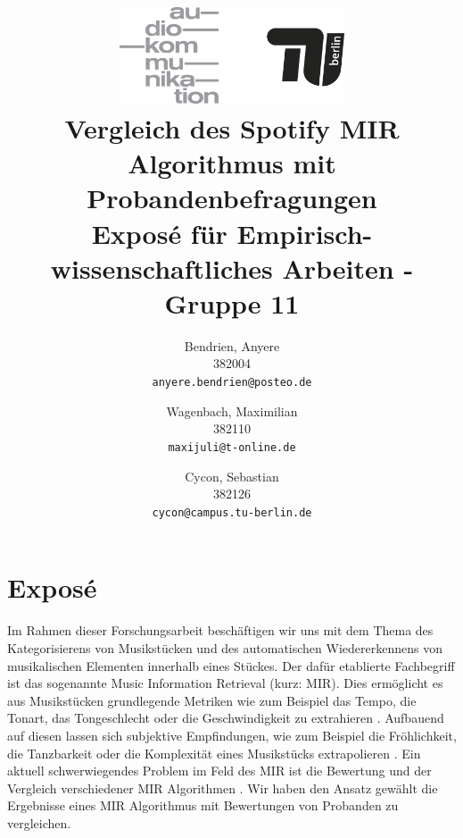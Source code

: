 





\title{
    \includegraphics[width=0.5\textwidth]{fig/audiokommtu-01.png}\\
    Vergleich des Spotify MIR Algorithmus mit Probandenbefragungen\\
    \vspace{2mm}
    \small{Exposé für Empirisch-wissenschaftliches Arbeiten - Gruppe 11}
}
\author
{
Bendrien, Anyere \\
382004\\
\small\texttt{anyere.bendrien@posteo.de}
\and
Wagenbach, Maximilian \\
382110\\
\small\texttt{maxijuli@t-online.de}
\and
Cycon, Sebastian \\
382126\\
\small\texttt{cycon@campus.tu-berlin.de}
}

\maketitle

\thispagestyle{empty} \newpage \setcounter{page}{1}


\section{Exposé}

Im Rahmen dieser Forschungsarbeit beschäftigen wir uns mit dem Thema des Kategorisierens von Musikstücken und des automatischen Wiedererkennens von musikalischen Elementen innerhalb eines Stückes.
Der dafür etablierte Fachbegriff ist das sogenannte Music Information Retrieval (kurz: MIR).
Dies ermöglicht es aus Musikstücken grundlegende Metriken wie zum Beispiel das Tempo, die Tonart, das Tongeschlecht oder die Geschwindigkeit zu extrahieren \cite{Casey2008}.
Aufbauend auf diesen lassen sich subjektive Empfindungen, wie zum Beispiel die Fröhlichkeit, die Tanzbarkeit oder die Komplexität eines Musikstücks extrapolieren \cite{Sturm2013}.
Ein aktuell schwerwiegendes Problem im Feld des MIR ist die Bewertung und der Vergleich verschiedener MIR Algorithmen \cite{Downie2004} \cite{Urbano_2013}. Wir haben den Ansatz gewählt die Ergebnisse eines MIR Algorithmus mit Bewertungen von Probanden zu vergleichen.


